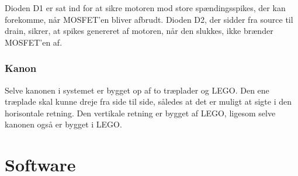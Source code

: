 Dioden D1 er sat ind for at sikre motoren mod store spændingsspikes, der kan forekomme, når MOSFET'en bliver afbrudt. Dioden D2, der sidder fra source til drain, sikrer, at spikes genereret af motoren, når den slukkes, ikke brænder MOSFET'en af. 

\subsubsection{Kanon}
Selve kanonen i systemet er bygget op af to træplader og LEGO. Den ene træplade skal kunne dreje fra side til side, således at det er muligt at sigte i den horisontale retning. Den vertikale retning er bygget af LEGO, ligesom selve kanonen også er bygget i LEGO. 

\section{Software}

